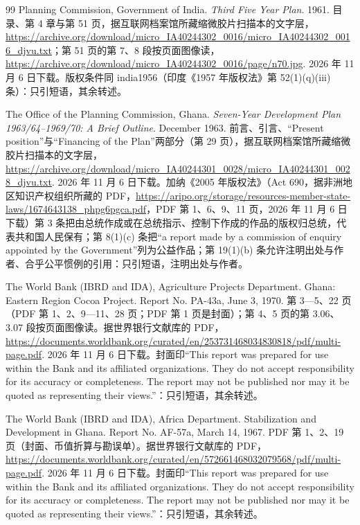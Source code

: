 \begin{thebibliography}{99}
 Planning Commission, Government of India. \emph{Third Five Year Plan}. 1961. 目录、第 4 章与第 51 页，据互联网档案馆所藏缩微胶片扫描本的文字层，\url{https://archive.org/download/micro_IA40244302_0016/micro_IA40244302_0016_djvu.txt}；第 51 页的第 7、8 段按页面图像读，\url{https://archive.org/download/micro_IA40244302_0016/page/n70.jpg}. 2026 年 11 月 6 日下载。版权条件同 india1956（印度《1957 年版权法》第 52(1)(q)(iii) 条）：只引短语，其余转述。

 The Office of the Planning Commission, Ghana. \emph{Seven-Year Development Plan 1963/64--1969/70: A Brief Outline}. December 1963. 前言、引言、“Present position”与“Financing of the Plan”两部分（第 29 页），据互联网档案馆所藏缩微胶片扫描本的文字层，\url{https://archive.org/download/micro_IA40244301_0028/micro_IA40244301_0028_djvu.txt}. 2026 年 11 月 6 日下载。加纳《2005 年版权法》（Act 690，据非洲地区知识产权组织所藏的 PDF，\url{https://aripo.org/storage/resources-member-state-laws/1674643138_phpg6pgca.pdf}，PDF 第 1、6、9、11 页，2026 年 11 月 6 日下载）第 3 条把由总统作成或在总统指示、控制下作成的作品的版权归总统，代表共和国人民保有；第 8(1)(c) 条把“a report made by a commission of enquiry appointed by the Government”列为公益作品；第 19(1)(b) 条允许注明出处与作者、合乎公平惯例的引用：只引短语，注明出处与作者。

 The World Bank (IBRD and IDA), Agriculture Projects Department. Ghana: Eastern Region Cocoa Project. Report No. PA-43a, June 3, 1970. 第 3—5、22 页（PDF 第 1、2、9—11、28 页；PDF 第 1 页是封面）；第 4、5 页的第 3.06、3.07 段按页面图像读。据世界银行文献库的 PDF，\url{https://documents.worldbank.org/curated/en/253731468034830818/pdf/multi-page.pdf}. 2026 年 11 月 6 日下载。封面印“This report was prepared for use within the Bank and its affiliated organizations. They do not accept responsibility for its accuracy or completeness. The report may not be published nor may it be quoted as representing their views.”：只引短语，其余转述。

 The World Bank (IBRD and IDA), Africa Department. Stabilization and Development in Ghana. Report No. AF-57a, March 14, 1967. PDF 第 1、2、19 页（封面、币值折算与勘误单）。据世界银行文献库的 PDF，\url{https://documents.worldbank.org/curated/en/572661468032079568/pdf/multi-page.pdf}. 2026 年 11 月 6 日下载。封面印“This report was prepared for use within the Bank and its affiliated organizations. They do not accept responsibility for its accuracy or completeness. The report may not be published nor may it be quoted as representing their views.”：只引短语，其余转述。


\end{thebibliography}
